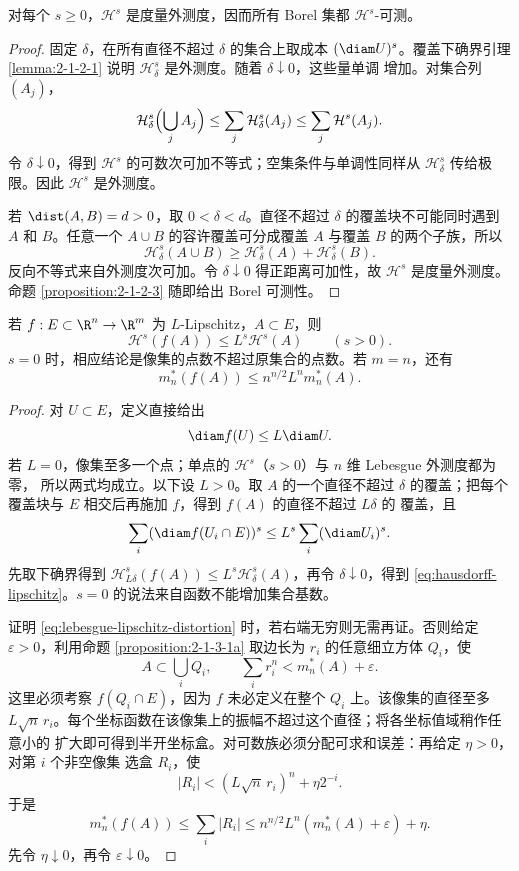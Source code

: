 \begin{proposition}\label{proposition:2-4-3-hausdorff-borel}
对每个 $s\ge0$，$\mathcal H^s$ 是度量外测度，因而所有 Borel 集都
$\mathcal H^s$-可测。
\end{proposition}

\begin{proof}
固定 $\delta$，在所有直径不超过 $\delta$ 的集合上取成本 $(\diam U)^s$。覆盖下确界引理
\ref{lemma:2-1-2-1} 说明 $\mathcal H^s_\delta$ 是外测度。随着 $\delta\downarrow0$，这些量单调
增加。对集合列 $(A_j)$，
\[
 \mathcal H^s_\delta\Bigl(\bigcup_jA_j\Bigr)
 \le\sum_j\mathcal H^s_\delta(A_j)
 \le\sum_j\mathcal H^s(A_j).
\]
令 $\delta\downarrow0$，得到 $\mathcal H^s$ 的可数次可加不等式；空集条件与单调性同样从
$\mathcal H^s_\delta$ 传给极限。因此 $\mathcal H^s$ 是外测度。

若 $\dist(A,B)=d>0$，取 $0<\delta<d$。直径不超过 $\delta$ 的覆盖块不可能同时遇到 $A$ 和
$B$。任意一个 $A\cup B$ 的容许覆盖可分成覆盖 $A$ 与覆盖 $B$ 的两个子族，所以
\[
 \mathcal H^s_\delta(A\cup B)
 \ge \mathcal H^s_\delta(A)+\mathcal H^s_\delta(B).
\]
反向不等式来自外测度次可加。令 $\delta\downarrow0$ 得正距离可加性，故
$\mathcal H^s$ 是度量外测度。命题 \ref{proposition:2-1-2-3} 随即给出 Borel
可测性。
\end{proof}

\begin{proposition}[覆盖畸变估计]\label{proposition:2-4-3-1}
若 $f:E\subset\R^n\to\R^m$ 为 $L$-Lipschitz，$A\subset E$，则
\[
 \mathcal H^s(f(A))\le L^s\mathcal H^s(A)\qquad(s>0).
 \tag{2.4.21}\label{eq:hausdorff-lipschitz}
\]
$s=0$ 时，相应结论是像集的点数不超过原集合的点数。若 $m=n$，还有
\[
 m_n^*(f(A))\le n^{n/2}L^n m_n^*(A).
 \tag{2.4.22}\label{eq:lebesgue-lipschitz-distortion}
\]
\end{proposition}

\begin{proof}
对 $U\subset E$，定义直接给出
\[
 \diam f(U)\le L\diam U.
\]
若 $L=0$，像集至多一个点；单点的 $\mathcal H^s$（$s>0$）与 $n$ 维 Lebesgue 外测度都为零，
所以两式均成立。以下设 $L>0$。取 $A$ 的一个直径不超过
$\delta$ 的覆盖；把每个覆盖块与 $E$ 相交后再施加 $f$，得到 $f(A)$ 的直径不超过 $L\delta$ 的
覆盖，且
\[
 \sum_i(\diam f(U_i\cap E))^s
 \le L^s\sum_i(\diam U_i)^s.
\]
先取下确界得到
$\mathcal H^s_{L\delta}(f(A))\le L^s\mathcal H^s_\delta(A)$，再令 $\delta\downarrow0$，得到
\eqref{eq:hausdorff-lipschitz}。$s=0$ 的说法来自函数不能增加集合基数。

证明 \eqref{eq:lebesgue-lipschitz-distortion} 时，若右端无穷则无需再证。否则给定
$\varepsilon>0$，利用命题 \ref{proposition:2-1-3-1a} 取边长为 $r_i$ 的任意细立方体 $Q_i$，使
\[
 A\subset\bigcup_iQ_i,
 \qquad \sum_ir_i^n<m_n^*(A)+\varepsilon.
\]
这里必须考察 $f(Q_i\cap E)$，因为 $f$ 未必定义在整个 $Q_i$ 上。该像集的直径至多
$L\sqrt n\,r_i$。每个坐标函数在该像集上的振幅不超过这个直径；将各坐标值域稍作任意小的
扩大即可得到半开坐标盒。对可数族必须分配可求和误差：再给定 $\eta>0$，对第 $i$ 个非空像集
选盒 $R_i$，使
\[
 |R_i|<(L\sqrt n\,r_i)^n+\eta2^{-i}.
\]
于是
\[
 m_n^*(f(A))
 \le\sum_i|R_i|
 \le n^{n/2}L^n(m_n^*(A)+\varepsilon)+\eta.
\]
先令 $\eta\downarrow0$，再令 $\varepsilon\downarrow0$。
\end{proof}

